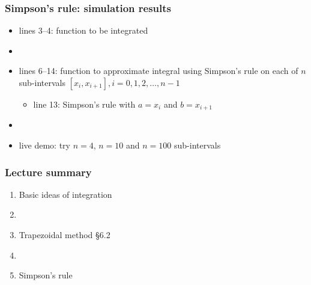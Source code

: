 \documentclass[english,14pt]{beamer}
\newcommand\red[1]{{\color{red} #1}}
\begin{document}

\begin{frame}[fragile]

\frametitle{Simpson's rule: simulation results}

\begin{itemize}
	\item lines 3--4: function to be integrated
	\item[]
	\item lines 6--14: function to approximate integral using Simpson's rule on each of $n$ sub-intervals $[x_i,x_{i+1}], i = 0,1,2,\ldots,n-1$
	\begin{itemize}
		\item line 13: Simpson's rule with $a=x_i$ and $b=x_{i+1}$
	\end{itemize}
	\item[]
	\item live demo: try $n=4$, $n=10$ and $n=100$ sub-intervals
\end{itemize}

\end{frame}


\begin{frame}[fragile]

\frametitle{Lecture summary}

\begin{enumerate}
	\item Basic ideas of integration
	
	\item[]
	
	\item Trapezoidal method \red{\S6.2}
	
	\item[]
	
	\item Simpson's rule
	
\end{enumerate}

\end{frame}
\end{document}
